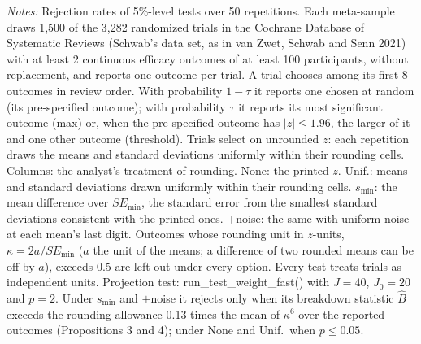 \begin{table}[htbp]
\begin{minipage}{\linewidth}\footnotesize\textit{Notes:} Rejection rates of 5\%-level tests over 50 repetitions. Each meta-sample draws 1{,}500 of the 3{,}282 randomized trials in the Cochrane Database of Systematic Reviews (Schwab's data set, as in van Zwet, Schwab and Senn 2021) with at least 2 continuous efficacy outcomes of at least 100 participants, without replacement, and reports one outcome per trial. A trial chooses among its first 8 outcomes in review order. With probability $1 - \tau$ it reports one chosen at random (its pre-specified outcome); with probability $\tau$ it reports its most significant outcome (max) or, when the pre-specified outcome has $|z| \le 1.96$, the larger of it and one other outcome (threshold). Trials select on unrounded $z$: each repetition draws the means and standard deviations uniformly within their rounding cells. Columns: the analyst's treatment of rounding. None: the printed $z$. Unif.: means and standard deviations drawn uniformly within their rounding cells. $s_{\min}$: the mean difference over $SE_{\min}$, the standard error from the smallest standard deviations consistent with the printed ones. $+$noise: the same with uniform noise at each mean's last digit. Outcomes whose rounding unit in $z$-units, $\kappa = 2a/SE_{\min}$ ($a$ the unit of the means; a difference of two rounded means can be off by $a$), exceeds 0.5 are left out under every option. Every test treats trials as independent units. Projection test: run\_test\_weight\_fast() with $J = 40$, $J_0 = 20$ and $p = 2$. Under $s_{\min}$ and $+$noise it rejects only when its breakdown statistic $\hat B$ exceeds the rounding allowance 0.13 times the mean of $\kappa^6$ over the reported outcomes (Propositions 3 and 4); under None and Unif.\ when $p \le 0.05$.\end{minipage}
\end{table}
